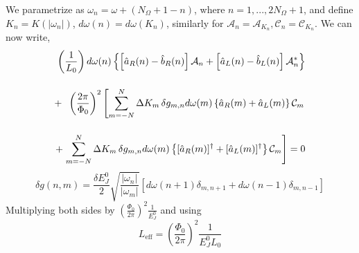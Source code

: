 We parametrize as $\omega_n = \omega + (N_{\Omega} + 1 - n)$, where $n = 1, ..., 2N_{\Omega}+1$, and define $K_n = K(|\omega_n|)$, $d \omega (n) = d \omega(K_n)$, similarly for $\mathcal{A}_n = \mathcal{A}_{K_n}, \mathcal{C}_n = \mathcal{C}_{K_n}$. We can now write, 
%
\begin{equation}\label{eq:BC_discrete_1}
\begin{split}
    \left(\frac{1}{L_0}\right)
    d\omega(n)
    \left\lbrace
    \left[\hat{a}_R(n) - \hat{b}_R(n)\right]
    \mathcal{A}_n 
    +
    \left[\hat{a}_L(n) - \hat{b}_L(n)\right]
    \mathcal{A}^*_n
    \right\rbrace
    \\[4mm]
    +\hspace{2mm}
    \left(\frac{2\pi}{\Phi_0}\right)^2
    \left[
    \sum_{m=-N}^{N} \Delta K_m\,
    \delta g_{m, n}
    d \omega(m)
    \left\lbrace \hat{a}_R(m) + \hat{a}_L(m) \right\rbrace
    \mathcal{C}_m\right.
    \\[4mm]
    +
    \left.
    \sum_{m=-N}^{N} \Delta K_m\,
    \delta g_{m, n}
    d \omega(m)
    \left\lbrace [\hat{a}_R(m)]^\dagger + [\hat{a}_L(m)]^\dagger \right\rbrace
    \mathcal{C}_m
    \right]
    = 0
 \end{split}
\end{equation}
%
\begin{equation}
    \delta g(n,m)= 
    \frac{\delta E_J^0}{2}
    \sqrt{\frac{|\omega_n|}{|\omega_m|}}
    \left[ 
    d\omega (n+1) \delta_{m, n+1}
    + d\omega (n-1) \delta_{m, n-1}
    \right]
\end{equation}
%
Multiplying both sides by $\left(\frac{\Phi_0}{2\pi}\right)^2 \frac{1}{E_J^0}$ and using 
\begin{equation}
    L_{\text{eff}} = \left(\frac{\Phi_0}{2\pi}\right)^2 \frac{1}{E_J^0 L_0}
\end{equation}
%

\begin{comment}
\begin{equation}\label{eq:BC_discrete_2}
\begin{split}
    L_{\text{eff}}\, 
    d\omega(n)
    \left\lbrace
    \left[\hat{a}_R(n) - \hat{b}_R(n)\right]
    \mathcal{A}_n 
    +
    \left[\hat{a}_L(n) - \hat{b}_L(n)\right]
    \mathcal{A}^*_n
    \right\rbrace
    \\[4mm]
    +\hspace{2mm}
    \frac{\delta E_J^0}{2 E_J^0}
    \sum_{m=1}^{2N_{\Omega}+1}
    \sqrt{\frac{|\omega_n|}{|\omega_m|}}
    d \omega(m)
    \left[ 
    \delta_{m, n+1}
    + \delta_{m, n-1}
    \right]
    \\[4mm]
    *
    \left[
    \Theta(\omega_n)
    \left\lbrace \hat{a}_R(m) + \hat{a}_L(m) \right\rbrace
    \mathcal{C}_m
    +
    \Theta(-\omega_n)
    \left\lbrace [\hat{a}_R(m)]^\dagger + [\hat{a}_L(m)]^\dagger \right\rbrace
    \mathcal{C}_m
    \right]
    = 0
 \end{split}
\end{equation}
\end{comment}


